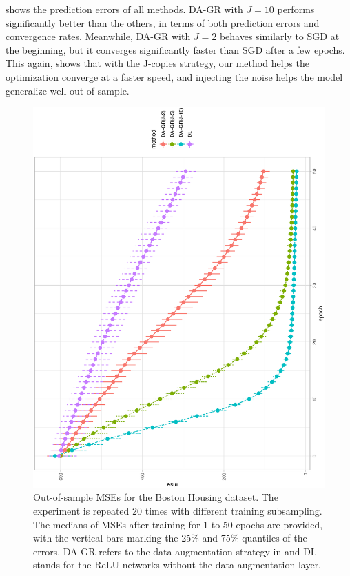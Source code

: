 \documentclass[ba]{imsart}
\numberwithin{equation}{section}
\theoremstyle{plain}
\begin{document}
 shows the prediction errors of all methods. DA-GR with $J=10$ performs significantly better than the others, in terms of both prediction errors and convergence rates. Meanwhile, DA-GR with $J=2$ behaves similarly to SGD at the beginning, but it converges significantly faster than SGD after a few epochs. This again, shows that with the J-copies strategy, our method helps the optimization converge at a faster speed, and injecting the noise helps the model generalize well out-of-sample.

\begin{figure}[!ht]
\centering
\includegraphics[height=0.95\textwidth,  angle=270]{fig/boston_mse_adam.eps}
\caption{Out-of-sample MSEs for the Boston Housing dataset. The experiment is repeated 20 times with different training subsampling. The medians of MSEs after training for 1 to 50 epochs are provided, with the vertical bars marking the 25\% and 75\% quantiles of the errors. DA-GR refers to the data augmentation strategy in  and DL stands for the ReLU networks without the data-augmentation layer.}\label{fig:boston}
\vspace{-0.1in}
\end{figure}

\end{document}
